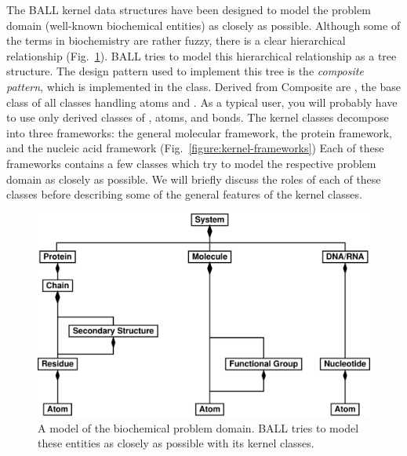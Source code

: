 The BALL kernel data structures have been designed to model the problem 
domain (\ie well-known biochemical entities) as closely as possible.
Although some of the terms in biochemistry are rather fuzzy, there is a clear
hierarchical relationship (Fig.~\ref{figure:problem-domain}).
BALL tries to model this hierarchical relationship as a tree structure.
The design pattern used to implement this tree is the {\em composite
pattern}\cite{DesignPatterns}, which is implemented in the  class.
Derived from Composite are , the base class of all
classes handling atoms and . As a typical user, you will probably
have to use only derived classes of , atoms, and bonds.
The kernel classes decompose into three frameworks: the general molecular
framework, the protein framework, and the nucleic acid framework
(Fig.~\ref{figure:kernel-frameworks})
Each of these frameworks contains a few classes which try to model the
respective problem domain as closely as possible. We will briefly discuss the
roles of each of these classes before describing some of the general features
of the kernel classes.

\begin{figure}[tb]
  \centering\includegraphics[width=\textwidth]{problem-domain.eps}
  \caption{A model of the biochemical problem domain. BALL tries to model
					these entities as closely as possible with its kernel classes.}
  \label{figure:problem-domain}
\end{figure}


